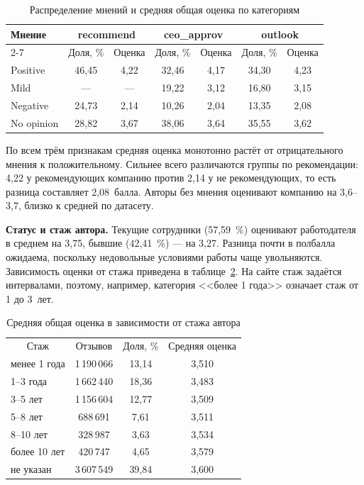 \begin{table}[!ht]
    \centering
    \small
    \begin{tabularx}{\textwidth}{|X|c|c|c|c|c|c|}
        \hline
        \multirow{2}{*}{Мнение} & \multicolumn{2}{c|}{recommend} & \multicolumn{2}{c|}{ceo\_approv} & \multicolumn{2}{c|}{outlook} \\ \cline{2-7}
         & Доля, \% & Оценка & Доля, \% & Оценка & Доля, \% & Оценка \\ \hhline{|=|=|=|=|=|=|=|}
        Positive   & 46,45 & 4,22 & 32,46 & 4,17 & 34,30 & 4,23 \\ \hline
        Mild       & ---   & ---  & 19,22 & 3,12 & 16,80 & 3,15 \\ \hline
        Negative   & 24,73 & 2,14 & 10,26 & 2,04 & 13,35 & 2,08 \\ \hline
        No opinion & 28,82 & 3,67 & 38,06 & 3,64 & 35,55 & 3,62 \\ \hline
    \end{tabularx}
    \caption{Распределение мнений и средняя общая оценка по категориям}
    \label{tab:opinions}
\end{table}

По всем трём признакам средняя оценка монотонно растёт от отрицательного мнения к положительному. Сильнее всего различаются группы по рекомендации: 4,22 у рекомендующих компанию против 2,14 у не рекомендующих, то есть разница составляет 2,08~балла. Авторы без мнения оценивают компанию на 3,6--3,7, близко к средней по датасету.

\textbf{Статус и стаж автора.} Текущие сотрудники (57,59~\%) оценивают работодателя в среднем на 3,75, бывшие (42,41~\%) --- на 3,27. Разница почти в полбалла ожидаема, поскольку недовольные условиями работы чаще увольняются. Зависимость оценки от стажа приведена в таблице~\ref{tab:tenure}. На сайте стаж задаётся интервалами, поэтому, например, категория <<более 1 года>> означает стаж от 1 до 3~лет.

\begin{table}[!ht]
    \centering
    \small
    \begin{tabularx}{\textwidth}{|X|c|c|c|}
        \hline
        \multicolumn{1}{|c|}{Стаж} & Отзывов & Доля, \% & Средняя оценка \\ \hhline{|=|=|=|=|}
        менее 1 года  & 1\,190\,066 & 13,14 & 3,510 \\ \hline
        1--3 года     & 1\,662\,440 & 18,36 & 3,483 \\ \hline
        3--5 лет      & 1\,156\,604 & 12,77 & 3,509 \\ \hline
        5--8 лет      & 688\,691    & 7,61  & 3,511 \\ \hline
        8--10 лет     & 328\,987    & 3,63  & 3,534 \\ \hline
        более 10 лет  & 420\,747    & 4,65  & 3,579 \\ \hline
        не указан     & 3\,607\,549 & 39,84 & 3,600 \\ \hline
    \end{tabularx}
    \caption{Средняя общая оценка в зависимости от стажа автора}
    \label{tab:tenure}
\end{table}

